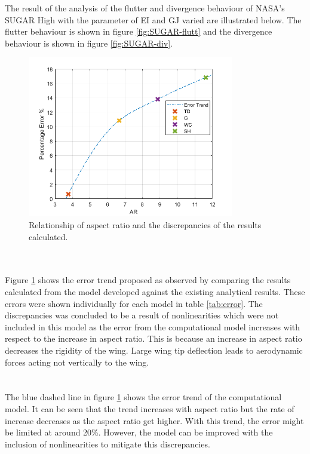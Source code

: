 \documentclass[11pt]{article}
\begin{document}
The result of the analysis of the flutter and divergence behaviour of NASA's SUGAR High with the parameter of EI and GJ varied are illustrated below. The flutter behaviour is shown in figure \ref{fig:SUGAR-flutt} and the divergence behaviour is shown in figure \ref{fig:SUGAR-div}.\\
\vspace{-1cm}
\begin{figure}
    \centering
    \includegraphics[width = 9cm]{figures/error-trend.png}
    \caption{Relationship of aspect ratio and the discrepancies of the results calculated.}
    \label{fig:error}
\end{figure}
\\ \\
Figure \ref{fig:error} shows the error trend proposed as observed by comparing the results calculated from the model developed against the existing analytical results. These errors were shown individually for each model in table \ref{tab:error}. The discrepancies was concluded to be a result of nonlinearities which were not included in this model as the error from the computational model increases with respect to the increase in aspect ratio. This is because an increase in aspect ratio decreases the rigidity of the wing. Large wing tip deflection leads to aerodynamic forces acting not vertically to the wing.\\ \\ \\

The blue dashed line in figure \ref{fig:error} shows the error trend of the computational model. It can be seen that the trend increases with aspect ratio but the rate of increase decreases as the aspect ratio get higher. With this trend, the error might be limited at around 20\%. However, the model can be improved with the inclusion of nonlinearities to mitigate this discrepancies.
\end{document}
